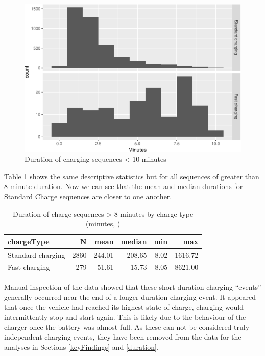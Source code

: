 \documentclass[]{article}
\begin{document}
\begin{figure}
\centering
\includegraphics{EVBB_report_files/figure-latex/shortDuration-1.pdf}
\caption{\label{fig:shortDuration}Duration of charging sequences \textless{}
10 minutes}
\end{figure}

Table \ref{tab:durationDescTableReduced} shows the same descriptive
statistics but for all sequences of greater than 8 minute duration. Now
we can see that the mean and median durations for Standard Charge
sequences are closer to one another.

\begin{table}[t]

\caption{\label{tab:durationDescTableReduced}Duration of charge sequences > 8 minutes by charge type (minutes, )}
\centering
\begin{tabular}{l|r|r|r|r|r}
\hline
chargeType & N & mean & median & min & max\\
\hline
Standard charging & 2860 & 244.01 & 208.65 & 8.02 & 1616.72\\
\hline
Fast charging & 279 & 51.61 & 15.73 & 8.05 & 8621.00\\
\hline
\end{tabular}
\end{table}

Manual inspection of the data showed that these short-duration charging
``events'' generally occurred near the end of a longer-duration charging
event. It appeared that once the vehicle had reached its highest state
of charge, charging would intermittently stop and start again. This is
likely due to the behaviour of the charger once the battery was almost
full. As these can not be considered truly independent charging events,
they have been removed from the data for the analyses in Sections
\ref{keyFindings} and \ref{duration}.
\end{document}

